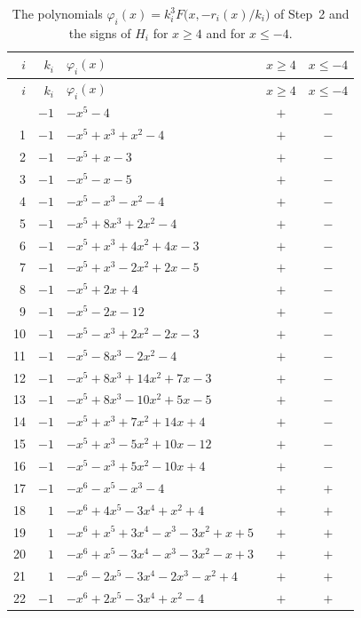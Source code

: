 \documentclass[11pt]{article}
\begin{document}
\begingroup\footnotesize
\setlength{\LTcapwidth}{\textwidth}
\begin{longtable}{@{}rrlcc@{}}
\caption{The polynomials $\varphi_i(x)=k_i^3F\bigl(x,-r_i(x)/k_i\bigr)$ of Step~2 and the signs of $H_i$ for $x\geq4$ and for $x\leq-4$.}\label{tab:phi}\\
\hline $i$ & $k_i$ & $\varphi_i(x)$ & $x\geq4$ & $x\leq-4$\\\hline\endfirsthead\hline $i$ & $k_i$ & $\varphi_i(x)$ & $x\geq4$ & $x\leq-4$\\\hline\endhead\hline\endfoot
0 & $-1$ & $-x^{5}-4$ & $+$ & $-$\\
1 & $-1$ & $-x^{5}+x^{3}+x^{2}-4$ & $+$ & $-$\\
2 & $-1$ & $-x^{5}+x-3$ & $+$ & $-$\\
3 & $-1$ & $-x^{5}-x-5$ & $+$ & $-$\\
4 & $-1$ & $-x^{5}-x^{3}-x^{2}-4$ & $+$ & $-$\\
5 & $-1$ & $-x^{5}+8x^{3}+2x^{2}-4$ & $+$ & $-$\\
6 & $-1$ & $-x^{5}+x^{3}+4x^{2}+4x-3$ & $+$ & $-$\\
7 & $-1$ & $-x^{5}+x^{3}-2x^{2}+2x-5$ & $+$ & $-$\\
8 & $-1$ & $-x^{5}+2x+4$ & $+$ & $-$\\
9 & $-1$ & $-x^{5}-2x-12$ & $+$ & $-$\\
10 & $-1$ & $-x^{5}-x^{3}+2x^{2}-2x-3$ & $+$ & $-$\\
11 & $-1$ & $-x^{5}-8x^{3}-2x^{2}-4$ & $+$ & $-$\\
12 & $-1$ & $-x^{5}+8x^{3}+14x^{2}+7x-3$ & $+$ & $-$\\
13 & $-1$ & $-x^{5}+8x^{3}-10x^{2}+5x-5$ & $+$ & $-$\\
14 & $-1$ & $-x^{5}+x^{3}+7x^{2}+14x+4$ & $+$ & $-$\\
15 & $-1$ & $-x^{5}+x^{3}-5x^{2}+10x-12$ & $+$ & $-$\\
16 & $-1$ & $-x^{5}-x^{3}+5x^{2}-10x+4$ & $+$ & $-$\\
17 & $-1$ & $-x^{6}-x^{5}-x^{3}-4$ & $+$ & $+$\\
18 & $1$ & $-x^{6}+4x^{5}-3x^{4}+x^{2}+4$ & $+$ & $+$\\
19 & $1$ & $-x^{6}+x^{5}+3x^{4}-x^{3}-3x^{2}+x+5$ & $+$ & $+$\\
20 & $1$ & $-x^{6}+x^{5}-3x^{4}-x^{3}-3x^{2}-x+3$ & $+$ & $+$\\
21 & $1$ & $-x^{6}-2x^{5}-3x^{4}-2x^{3}-x^{2}+4$ & $+$ & $+$\\
22 & $-1$ & $-x^{6}+2x^{5}-3x^{4}+x^{2}-4$ & $+$ & $+$\\

\end{longtable}
\end{document}
